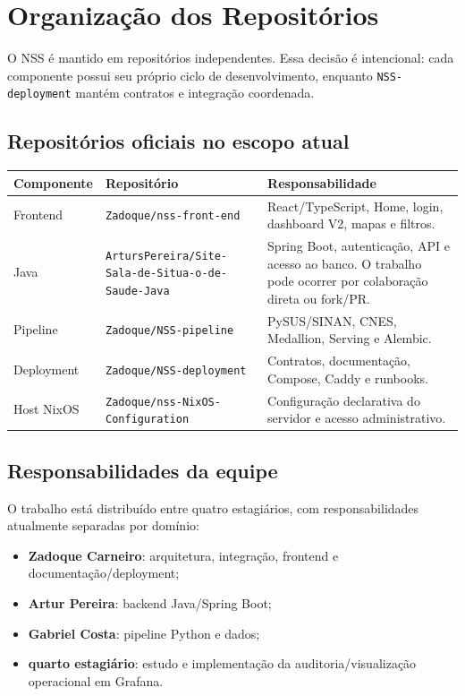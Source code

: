 \section{Organização dos Repositórios}

O NSS é mantido em repositórios independentes. Essa decisão é intencional: cada componente possui seu próprio ciclo de desenvolvimento, enquanto \texttt{NSS-deployment} mantém contratos e integração coordenada.

\subsection{Repositórios oficiais no escopo atual}

\begin{tabularx}{\textwidth}{@{}p{3.1cm}p{6cm}X@{}}
\toprule
\textbf{Componente} & \textbf{Repositório} & \textbf{Responsabilidade} \\
\midrule
Frontend & \texttt{Zadoque/nss-front-end} & React/TypeScript, Home, login, dashboard V2, mapas e filtros. \\
Java & \texttt{ArtursPereira/Site-Sala-de-Situa-o-de-Saude-Java} & Spring Boot, autenticação, API e acesso ao banco. O trabalho pode ocorrer por colaboração direta ou fork/PR. \\
Pipeline & \texttt{Zadoque/NSS-pipeline} & PySUS/SINAN, CNES, Medallion, Serving e Alembic. \\
Deployment & \texttt{Zadoque/NSS-deployment} & Contratos, documentação, Compose, Caddy e runbooks. \\
Host NixOS & \texttt{Zadoque/nss-NixOS-Configuration} & Configuração declarativa do servidor e acesso administrativo. \\
\bottomrule
\end{tabularx}

\subsection{Responsabilidades da equipe}

O trabalho está distribuído entre quatro estagiários, com responsabilidades atualmente separadas por domínio:

\begin{itemize}
    \item \textbf{Zadoque Carneiro}: arquitetura, integração, frontend e documentação/deployment;
    \item \textbf{Artur Pereira}: backend Java/Spring Boot;
    \item \textbf{Gabriel Costa}: pipeline Python e dados;
    \item \textbf{quarto estagiário}: estudo e implementação da auditoria/visualização operacional em Grafana.
\end{itemize}

